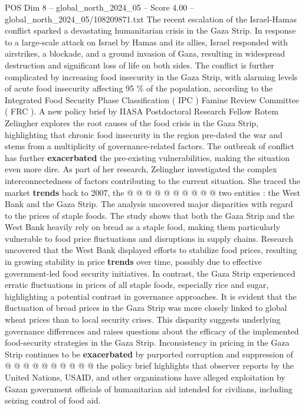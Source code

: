 \begin{textsample}{POS Dim 8 – global\_north\_2024\_05 – Score 4.00 – global\_north\_2024\_05/108209871.txt}  \label{ex:f8_pos_178}
The recent escalation of the Israel-Hamas conflict sparked a devastating humanitarian crisis in the Gaza Strip.
In response to a large-scale attack on Israel by Hamas and its allies, Israel responded with airstrikes, a blockade, and a ground invasion of Gaza, resulting in widespread destruction and significant loss of life on both sides.
The conflict is further complicated by increasing food insecurity in the Gaza Strip, with alarming levels of acute food insecurity affecting 95 \% of the population, according to the Integrated Food Security Phase Classification ( IPC ) Famine Review Committee ( FRC ).
A new policy brief by IIASA Postdoctoral Research Fellow Rotem Zelingher explores the root causes of the food crisis in the Gaza Strip, highlighting that chronic food insecurity in the region pre-dated the war and stems from a multiplicity of governance-related factors.
The outbreak of conflict has further \textbf{exacerbated} the pre-existing vulnerabilities, making the situation even more dire.
As part of her research, Zelingher investigated the complex interconnectedness of factors contributing to the current situation.
She traced the market \textbf{trends} back to 2007, the @ @ @ @ @ @ @ @ @ @ two entities : the West Bank and the Gaza Strip.
The analysis uncovered major disparities with regard to the prices of staple foods.
The study shows that both the Gaza Strip and the West Bank heavily rely on bread as a staple food, making them particularly vulnerable to food price fluctuations and disruptions in supply chains.
Research uncovered that the West Bank displayed efforts to stabilize food prices, resulting in growing stability in price \textbf{trends} over time, possibly due to effective government-led food security initiatives.
In contrast, the Gaza Strip experienced erratic fluctuations in prices of all staple foods, especially rice and sugar, highlighting a potential contrast in governance approaches.
It is evident that the fluctuation of bread prices in the Gaza Strip was more closely linked to global wheat prices than to local security crises.
This disparity suggests underlying governance differences and raises questions about the efficacy of the implemented food-security strategies in the Gaza Strip.
Inconsistency in pricing in the Gaza Strip continues to be \textbf{exacerbated} by purported corruption and suppression of @ @ @ @ @ @ @ @ @ @ the policy brief highlights that observer reports by the United Nations, USAID, and other organizations have alleged exploitation by Gazan government officials of humanitarian aid intended for civilians, including seizing control of food aid.

\end{textsample}
